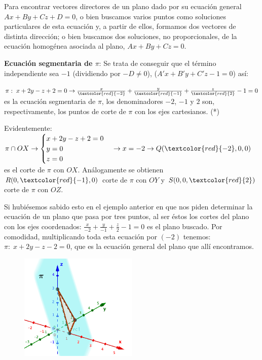Para encontrar vectores directores de un plano dado por su ecuación general $Ax+By+Cz+D=0$, o bien buscamos varios puntos como soluciones particulares de esta ecuación y, a partir de ellos, formamos dos vectores de distinta dirección; o bien buscamos dos soluciones, no proporcionales, de la ecuación homogénea asociada al plano, $Ax+By+Cz=0$.

\textbf{Ecuación segmentaria de $\pi$}: Se trata de conseguir que el término independiente sea $-1$  (dividiendo por $-D\neq 0$), ($A'x+B'y+C'z-1=0$) así:

$ \pi: \; x+2y-z+2=0 \to \frac x {\textcolor{red}{-2}} + \frac y {\textcolor{red}{-1}} + \frac z {\textcolor{red}{2}} - 1 =0$ es la ecuación segmentaria de $\pi$, los denominadores $-2$, $-1$ y $2$ son, respectivamente, los puntos de corte de $\pi$ con los ejes cartesianos. (*)

Evidentemente: $\pi \cap OX \to \begin{cases} x+2y-z+2=0\\y=0\\z=0 \end{cases} \to x=-2 \to Q(\textcolor{red}{-2},0,0)$ es el corte de $\pi$ con $OX$. Análogamente se obtienen $R(0,\textcolor{red}{-1},0)$ corte de $\pi$ con $OY$ y $S(0,0,\textcolor{red}{2})$ corte de $\pi$ con $OZ$.

	\begin{multicols}{2}
	\small{Si hubiésemos sabido esto en el ejemplo anterior en que nos piden determinar la ecuación de un plano que pasa por tres puntos, al ser éstos los cortes del plano con los ejes coordenados: $\frac x {-2}+\frac y {-1}+\frac z 2 - 1 = 0$ es el plano buscado. Por comodidad, multiplicando toda esta ecuación por $(-2)$ tenemos: $\pi:\; x+2y-z-2=0$, que es la ecuación general del plano que allí encontramos}\normalsize{.}

	\begin{figure}[H]
		\centering
		\includegraphics[width=0.5\textwidth]{imagenes/imagenes10/T10IM03.png}
	\end{figure}
	\end{multicols}


